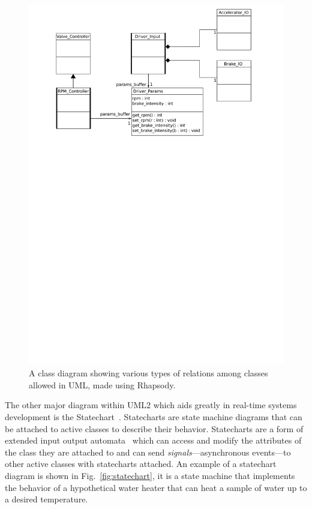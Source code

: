 \begin{figure}
\centering
\includegraphics[scale=0.75]{figs/class_diag}
\caption[Class diagram showing relations among classes.]{A class
  diagram showing various types of relations among classes allowed in
  UML, made using Rhapsody.}
\label{fig:class_diag}
\end{figure}

The other major diagram within UML2 which aids greatly in real-time
systems development is the Statechart~\cite{jansamak@acsc04,
  allen@sigplan95}. Statecharts are state machine diagrams that can be
attached to active classes to describe their behavior. Statecharts are
a form of extended input output automata~\cite{lynch@concur01} which
can access and modify the attributes of the class they are attached to
and can send \emph{signals}---asynchronous events---to other active
classes with statecharts attached. An example of a statechart diagram
is shown in Fig.~\ref{fig:statechart}, it is a state machine that
implements the behavior of a hypothetical water heater that can heat a
sample of water up to a desired temperature.

